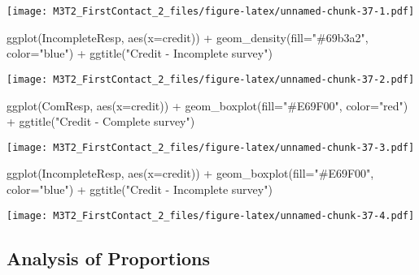 \documentclass[
]{article}
\newenvironment{Shaded}{\begin{snugshade}}{\end{snugshade}}
\newcommand{\AttributeTok}[1]{\textcolor[rgb]{0.77,0.63,0.00}{#1}}
\newcommand{\FunctionTok}[1]{\textcolor[rgb]{0.00,0.00,0.00}{#1}}
\newcommand{\NormalTok}[1]{#1}
\newcommand{\SpecialCharTok}[1]{\textcolor[rgb]{0.00,0.00,0.00}{#1}}
\newcommand{\StringTok}[1]{\textcolor[rgb]{0.31,0.60,0.02}{#1}}
\begin{document}
\texttt{[image: M3T2\_FirstContact\_2\_files/figure-latex/unnamed-chunk-37-1.pdf]}

\begin{Shaded}
\begin{Highlighting}[]
\FunctionTok{ggplot}\NormalTok{(IncompleteResp, }\FunctionTok{aes}\NormalTok{(}\AttributeTok{x=}\NormalTok{credit)) }\SpecialCharTok{+}
    \FunctionTok{geom\_density}\NormalTok{(}\AttributeTok{fill=}\StringTok{"\#69b3a2"}\NormalTok{, }\AttributeTok{color=}\StringTok{"blue"}\NormalTok{) }\SpecialCharTok{+} 
  \FunctionTok{ggtitle}\NormalTok{(}\StringTok{"Credit {-} Incomplete survey"}\NormalTok{)}
\end{Highlighting}
\end{Shaded}

\texttt{[image: M3T2\_FirstContact\_2\_files/figure-latex/unnamed-chunk-37-2.pdf]}

\begin{Shaded}
\begin{Highlighting}[]
\FunctionTok{ggplot}\NormalTok{(ComResp, }\FunctionTok{aes}\NormalTok{(}\AttributeTok{x=}\NormalTok{credit)) }\SpecialCharTok{+} \FunctionTok{geom\_boxplot}\NormalTok{(}\AttributeTok{fill=}\StringTok{"\#E69F00"}\NormalTok{, }\AttributeTok{color=}\StringTok{"red"}\NormalTok{)  }\SpecialCharTok{+} \FunctionTok{ggtitle}\NormalTok{(}\StringTok{"Credit {-} Complete survey"}\NormalTok{)  }
\end{Highlighting}
\end{Shaded}

\texttt{[image: M3T2\_FirstContact\_2\_files/figure-latex/unnamed-chunk-37-3.pdf]}

\begin{Shaded}
\begin{Highlighting}[]
\FunctionTok{ggplot}\NormalTok{(IncompleteResp, }\FunctionTok{aes}\NormalTok{(}\AttributeTok{x=}\NormalTok{credit)) }\SpecialCharTok{+} \FunctionTok{geom\_boxplot}\NormalTok{(}\AttributeTok{fill=}\StringTok{"\#E69F00"}\NormalTok{, }\AttributeTok{color=}\StringTok{"blue"}\NormalTok{) }\SpecialCharTok{+} \FunctionTok{ggtitle}\NormalTok{(}\StringTok{"Credit {-} Incomplete survey"}\NormalTok{)}
\end{Highlighting}
\end{Shaded}

\texttt{[image: M3T2\_FirstContact\_2\_files/figure-latex/unnamed-chunk-37-4.pdf]}

\hypertarget{analysis-of-proportions}{%
\subsection{Analysis of Proportions}\label{analysis-of-proportions}}
\end{document}

